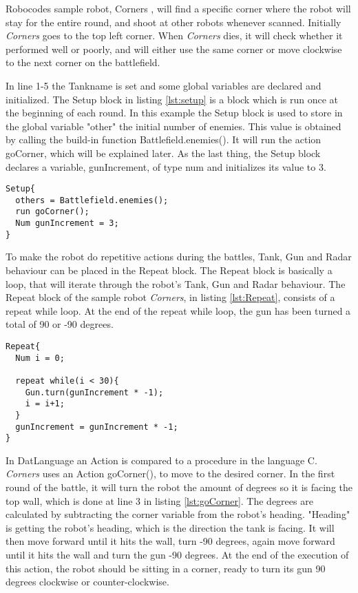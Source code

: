 Robocodes sample robot, Corners \citep{Corners}, will find a specific corner where the robot will stay for the entire round, and shoot at other robots whenever scanned. Initially \textit{Corners} goes to the top left corner. When \textit{Corners} dies, it will check whether it performed well or poorly, and will either use the same corner or move clockwise to the next corner on the battlefield.

In line 1-5 the Tankname is set and some global variables are declared and initialized. The Setup block in listing \ref{lst:setup} is a block which is run once at the beginning of each round. In this example the Setup block is used to store in the global variable "other" the initial number of enemies. This value is obtained by calling the build-in function Battlefield.enemies(). It will run the action goCorner, which will be explained later. As the last thing, the Setup block declares a variable, gunIncrement, of type num and initializes its value to 3.

\begin{lstlisting}[caption={Code listing of the Setup block},  xleftmargin=.2\textwidth, label={lst:setup}]
Setup{
  others = Battlefield.enemies();  
  run goCorner();	 
  Num gunIncrement = 3;
}
\end{lstlisting}

To make the robot do repetitive actions during the battles, Tank, Gun and Radar behaviour can be placed in the Repeat block. The Repeat block is basically a loop, that will iterate through the robot's Tank, Gun and Radar behaviour. The Repeat block of the sample robot \textit{Corners}, in listing \ref{lst:Repeat}, consists of a repeat while loop. At the end of the repeat while loop, the gun has been turned a total of 90 or -90 degrees. 

\begin{lstlisting}[caption={Code listing of the Repeat block}, xleftmargin=.2\textwidth, label={lst:Repeat}]
Repeat{  
  Num i = 0;
  
  repeat while(i < 30){
    Gun.turn(gunIncrement * -1);
    i = i+1;
  }  
  gunIncrement = gunIncrement * -1;
}
\end{lstlisting}

In DatLanguage an Action is compared to a procedure in the language C. \textit{Corners} uses an Action goCorner(), to move to the desired corner. In the first round of the battle, it will turn the robot the amount of degrees so it is facing the top wall, which is done at line 3 in listing \ref{lst:goCorner}. The degrees are calculated by subtracting the corner variable from the robot’s heading. "Heading" is getting the robot's heading, which is the direction the tank is facing. It will then move forward until it hits the wall, turn -90 degrees, again move forward until it hits the wall and turn the gun -90 degrees. At the end of the execution of this action, the robot should be sitting in a corner, ready to turn its gun 90 degrees clockwise or counter-clockwise.


